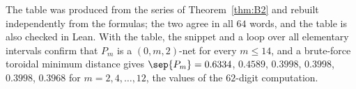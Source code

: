 The table was produced from the series of Theorem~\ref{thm:B2} and rebuilt independently from the formulas; the two agree in all $64$ words, and the table is also checked in Lean. With the table, the snippet and a loop over all elementary intervals confirm that $P_m$ is a $(0,m,2)$-net for every $m\le14$, and a brute-force toroidal minimum distance gives $\sep{P_m}=0.6334$, $0.4589$, $0.3998$, $0.3998$, $0.3998$, $0.3968$ for $m=2,4,\dots,12$, the values of the $62$-digit computation.
